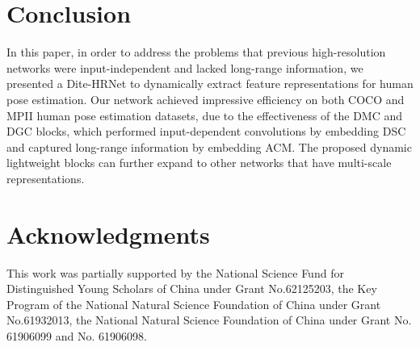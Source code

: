 \documentclass{article}
\begin{document}
\section{Conclusion}
In this paper, in order to address the problems that previous high-resolution networks were input-independent and lacked long-range information, we presented a Dite-HRNet to dynamically extract feature representations for human pose estimation. Our network achieved impressive efficiency on both COCO and MPII human pose estimation datasets, due to the effectiveness of the DMC and DGC blocks, which performed input-dependent convolutions by embedding DSC and captured long-range information by embedding ACM. The proposed dynamic lightweight blocks can further expand to other networks that have multi-scale representations.

\section*{Acknowledgments}
This work was partially supported by the National Science Fund for Distinguished Young Scholars of China under Grant No.62125203, the Key Program of the National Natural Science Foundation of China under Grant No.61932013, the National Natural Science Foundation of China under Grant No. 61906099 and No. 61906098.



\end{document}
